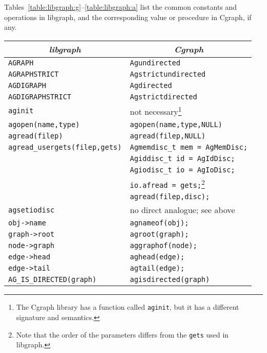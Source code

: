 \documentclass[11pt,letterpaper]{article}
\begin{document}
Tables~\ref{table:libgraph:g}--\ref{table:libgraph:a} list the common 
constants and operations in
libgraph, and the corresponding value or procedure in Cgraph, if any.

\begin{savenotes}
\begin{table*}[htb]
\centering
\begin{tabular}{|l|l|} \hline
\multicolumn{1}{|c|}{\em libgraph} & \multicolumn{1}{c|}{\em Cgraph} \\ \hline
\verb"AGRAPH"  &  \verb"Agundirected" \\ \hline
\verb"AGRAPHSTRICT" &  \verb"Agstrictundirected" \\ \hline
\verb"AGDIGRAPH" &  \verb"Agdirected" \\ \hline
\verb"AGDIGRAPHSTRICT"  &  \verb"Agstrictdirected" \\ \hline
\verb"aginit" &  not necessary\footnote{The Cgraph library has a function called \texttt{aginit}, but it has a different signature and semantics.} \\ \hline
\verb"agopen(name,type)" &  \verb"agopen(name,type,NULL)"\\ \hline
\verb"agread(filep)" &  \verb"agread(filep,NULL)"\\ \hline
\verb"agread_usergets(filep,gets)" &  \verb"Agmemdisc_t mem = AgMemDisc;" \\
                            &  \verb"Agiddisc_t id = AgIdDisc;" \\
                            &  \verb"Agiodisc_t io = AgIoDisc;" \\
                            &  \verb"io.afread = gets;"\footnote{Note that the order of the parameters differs from the \texttt{gets} used in libgraph.} \\
                            &  \verb"agread(filep,disc);"\\ \hline
\verb"agsetiodisc" &  no direct analogue; see above \\ \hline
\verb"obj->name"   &  \verb"agnameof(obj);" \\ \hline
\verb"graph->root"   &  \verb"agroot(graph);" \\ \hline
\verb"node->graph"   &  \verb"aggraphof(node);" \\ \hline
\verb"edge->head"   &  \verb"aghead(edge);" \\ \hline
\verb"edge->tail"   &  \verb"agtail(edge);" \\ \hline
\verb"AG_IS_DIRECTED(graph)" &  \verb"agisdirected(graph)"  \\ \hline

\end{tabular}
\end{table*}
\end{savenotes}
\end{document}
